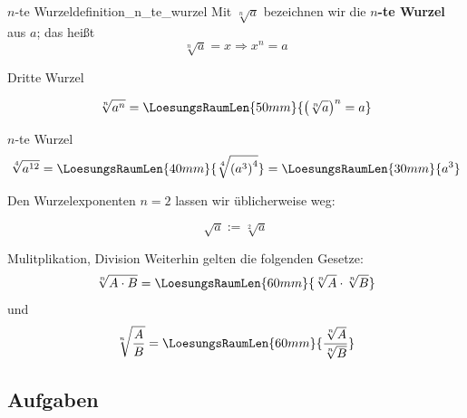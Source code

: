 


\newpage
\begin{definition}{$n$-te Wurzel}{definition_n_te_wurzel}
Mit $\sqrt[n]{a}$ bezeichnen wir die $n$\textbf{-te Wurzel} aus $a$; das heißt
$$\sqrt[n]{a} = x \Rightarrow x^n = a$$
\end{definition}

\begin{beispiel}{Dritte Wurzel}{}
\end{beispiel}

\begin{gesetz}{}{}
$$\sqrt[n]{a^n} = \LoesungsRaumLen{50mm}{\left(\sqrt[n]a\right)^n = a}$$
\end{gesetz}

\begin{beispiel}{$n$-te Wurzel}{}
  $$\sqrt[4]{a^{12}} =  \LoesungsRaumLen{40mm}{\sqrt[4]{\left(a^3\right)^4}} = \LoesungsRaumLen{30mm}{a^3}$$
\end{beispiel}


\begin{definition}{}{}
Den Wurzelexponenten $n=2$ lassen wir üblicherweise weg:

$$\sqrt{a} := \sqrt[2]{a}$$
\end{definition}

\begin{gesetz}{Mulitplikation, Division}{}
  Weiterhin gelten die folgenden Gesetze:
  $$\sqrt[n]{A\cdot{}B}     = \LoesungsRaumLen{60mm}{\sqrt[n]{A}\cdot{}\sqrt[n]{B}}$$ und
  $$\sqrt[n\,]{\frac{A}{B}} = \LoesungsRaumLen{60mm}{\frac{\sqrt[n]{A}}{\sqrt[n]{B}}}$$
\end{gesetz}

\subsection*{Aufgaben}




